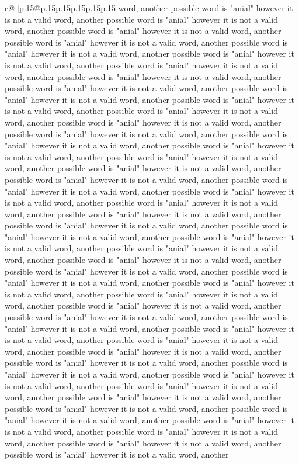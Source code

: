 \documentclass{article}
\begin{document}
{\begin{supertabular}{c@{$\;$}|p{.15\linewidth}@{}p{.15\linewidth}p{.15\linewidth}p{.15\linewidth}p{.15\linewidth}p{.15\linewidth}}
{{{word, another possible word is "anial" however it is not a valid word, another possible word is "anial" however it is not a valid word, another possible word is "anial" however it is not a valid word, another possible word is "anial" however it is not a valid word, another possible word is "anial" however it is not a valid word, another possible word is "anial" however it is not a valid word, another possible word is "anial" however it is not a valid word, another possible word is "anial" however it is not a valid word, another possible word is "anial" however it is not a valid word, another possible word is "anial" however it is not a valid word, another possible word is "anial" however it is not a valid word, another possible word is "anial" however it is not a valid word, another possible word is "anial" however it is not a valid word, another possible word is "anial" however it is not a valid word, another possible word is "anial" however it is not a valid word, another possible word is "anial" however it is not a valid word, another possible word is "anial" however it is not a valid word, another possible word is "anial" however it is not a valid word, another possible word is "anial" however it is not a valid word, another possible word is "anial" however it is not a valid word, another possible word is "anial" however it is not a valid word, another possible word is "anial" however it is not a valid word, another possible word is "anial" however it is not a valid word, another possible word is "anial" however it is not a valid word, another possible word is "anial" however it is not a valid word, another possible word is "anial" however it is not a valid word, another possible word is "anial" however it is not a valid word, another possible word is "anial" however it is not a valid word, another possible word is "anial" however it is not a valid word, another possible word is "anial" however it is not a valid word, another possible word is "anial" however it is not a valid word, another possible word is "anial" however it is not a valid word, another possible word is "anial" however it is not a valid word, another possible word is "anial" however it is not a valid word, another possible word is "anial" however it is not a valid word, another possible word is "anial" however it is not a valid word, another possible word is "anial" however it is not a valid word, another possible word is "anial" however it is not a valid word, another possible word is "anial" however it is not a valid word, another possible word is "anial" however it is not a valid word, another possible word is "anial" however it is not a valid word, another possible word is "anial" however it is not a valid word, another possible word is "anial" however it is not a valid word, another possible word is "anial" however it is not a valid word, another possible word is "anial" however it is not a valid word, another possible word is "anial" however it is not a valid word, another possible word is "anial" however it is not a valid word, another possible word is "anial" however it is not a valid word, another possible word is "anial" however it is not a valid word, another }}}
\end{supertabular}}
\end{document}

